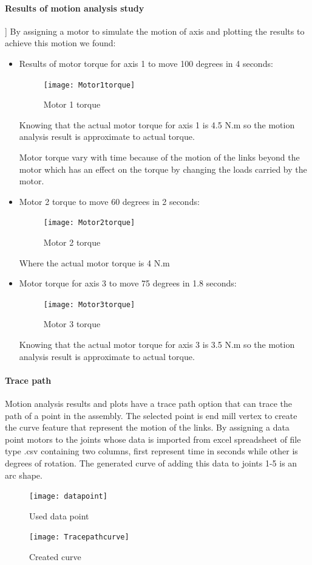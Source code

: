 \paragraph{Results of motion analysis study}] 
By assigning a motor to simulate the motion of axis and plotting the results to achieve this motion we found:
\begin{itemize}
	\item Results of motor torque for axis 1 to move 100 degrees in 4 seconds:
	\begin{figure}[H]
		\centering
		\texttt{[image: Motor1torque]}
        \caption{Motor 1 torque}
	\end{figure}
Knowing that the actual motor torque for axis 1 is 4.5 N.m so the motion analysis result is approximate to actual torque. 
 
Motor torque vary with time because of the motion of the links beyond the motor which has an effect on the torque by changing the loads carried by the motor.
\item Motor 2 torque to move 60 degrees in 2 seconds:
	\begin{figure}[H]
    \centering
    \texttt{[image: Motor2torque]}
    \caption{Motor 2 torque}
\end{figure}
 Where the actual motor torque is 4 N.m

\item Motor torque for axis 3 to move 75 degrees in 1.8 seconds:
	\begin{figure}[H]
    \centering
    \texttt{[image: Motor3torque]}
    \caption{Motor 3 torque}
\end{figure}

 Knowing that the actual motor torque for axis 3 is 3.5 N.m so the motion analysis result is approximate to actual torque.
\end{itemize}

\paragraph{Trace path}
Motion analysis results and plots have a trace path option that can trace the path of a point in the assembly. The selected point is end mill vertex to create the curve feature that represent the motion of the links.  By assigning a data point motors to the joints whose data is imported from excel spreadsheet of file type .csv containing two columns, first represent time in seconds while other is degrees of rotation. The generated curve of adding this data to joints 1-5 is an arc shape.
\begin{figure}[h]
	\centering
	\texttt{[image: datapoint]}
    	\caption{Used data point}
\end{figure}
\begin{figure}[H]
	\centering
	\texttt{[image: Tracepathcurve]}
    	\caption{Created curve}
\end{figure}

